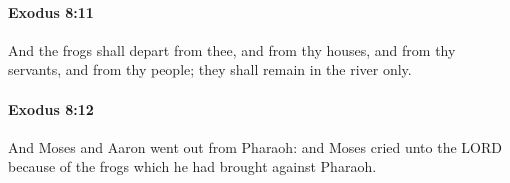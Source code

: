 		\paragraph{Exodus 8:11} %
			\label{EXODUS-8-11}

			And the frogs shall depart from thee, and from thy houses, and from thy servants, and from thy people; they shall remain in the river only.


		\paragraph{Exodus 8:12} %
			\label{EXODUS-8-12}

			And Moses and Aaron went out from Pharaoh: and Moses cried unto the LORD because of the frogs which he had brought against Pharaoh.


